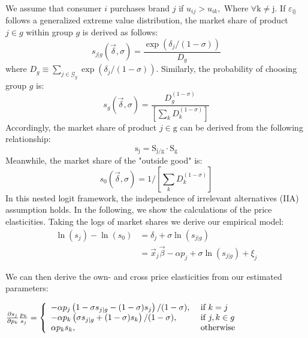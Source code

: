 \documentclass[12pt, authoryear]{elsarticle}
\begin{document}
We assume that consumer $i$ purchases brand $j$ if $ { u } _ { { ij } } >  { u } _ {  { ik } } ,$ Where $\mathrm { \forall } \mathrm { k } \neq \mathrm { j }$. If $\varepsilon _ { \mathrm { ij } }$ follows a generalized
extreme value distribution, the market share of product $j \in g$ within group $g$ is derived as follows:
\begin{equation}
s _ { j | g } ( \vec { \delta } , \sigma ) = \frac { \exp \left( \delta _ { j } / ( 1 - \sigma ) \right) } { D _ { g } }
\end{equation}
where $D _ { g } \equiv \sum _ { j \in \mathcal { G } _ { g } } \exp \left( \delta _ { j } / ( 1 - \sigma ) \right)$.
Similarly, the probability of choosing group $g$ is:
\begin{equation}
s _ { g } ( \vec { \delta } , \sigma ) = \frac { D _ { g } ^ { ( 1 - \sigma ) } } { \left[ \sum _ { k } D _ { k } ^ { ( 1 - \sigma ) } \right] }
\end{equation}
Accordingly, the market share of product $ { j } \in \mathrm { g }$ can be derived from the following relationship:
\begin{equation}
\mathrm { s } _ { \mathrm { j } } = \mathrm { S } _ { \mathrm { j } / \mathrm { g } } \cdot \mathrm { S } _ { \mathrm { g } }
\end{equation}
Meanwhile, the market share of the "outside good" is:
\begin{equation}
s _ { 0 } ( \vec { \delta } , \sigma ) = 1 / \left[ \sum _ { k } D _ { k } ^ { ( 1 - \sigma ) } \right]
\end{equation}
In this nested logit framework, the independence of irrelevant alternatives (IIA) assumption holds. In the following, we show the calculations of the price elasticities.
Taking the logs of market shares we derive our empirical model:
\begin{equation}
\begin{aligned} \ln \left( s _ { j } \right) - \ln \left( s _ { 0 } \right) & = \delta _ { j } + \sigma \ln \left( s _ { j | g } \right) \\ & = \vec { x } _ { j } \vec { \beta } - \alpha p _ { j } + \sigma \ln \left( s _ {j | g } \right) + \xi _ { j } \end{aligned}
\end{equation}

We can then derive the own- and cross price elasticities from our estimated parameters:

$\frac { \partial s _ { j } } { \partial p _ { k } } \frac { p _ { k } } { s _ { j } } = \left\{ \begin{array} { l l } { - \alpha p _ { j } \left( 1 - \sigma s _ { j | g } - ( 1 - \sigma ) s _ { j } \right) / ( 1 - \sigma ) , } & { \text { if } k = j } \\ { - \alpha p _ { k } \left( \sigma s _ { j | g } + ( 1 - \sigma ) s _ { k } \right) / ( 1 - \sigma ) , } & { \text { if } j , k \in g } \\ { \alpha p _ { k } s _ { k } , } & { \text { otherwise } } \end{array} \right.$
\end{document}
